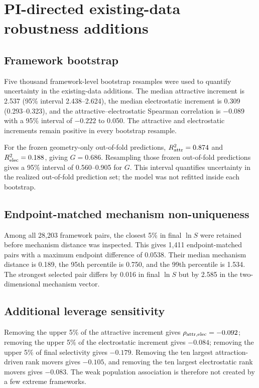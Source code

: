 \documentclass[11pt,a4paper]{article}
\begin{document}
\section{PI-directed existing-data robustness additions}

\subsection{Framework bootstrap}

Five thousand framework-level bootstrap resamples were used to quantify uncertainty in the existing-data additions. The median attractive increment is 2.537 (95\% interval 2.438--2.624), the median electrostatic increment is 0.309 (0.293--0.323), and the attractive--electrostatic Spearman correlation is $-0.089$ with a 95\% interval of $-0.222$ to 0.050. The attractive and electrostatic increments remain positive in every bootstrap resample.

For the frozen geometry-only out-of-fold predictions, $R^2_{\rm attr}=0.874$ and $R^2_{\rm elec}=0.188$, giving $G=0.686$. Resampling those frozen out-of-fold predictions gives a 95\% interval of 0.560--0.905 for $G$. This interval quantifies uncertainty in the realized out-of-fold prediction set; the model was not refitted inside each bootstrap.

\subsection{Endpoint-matched mechanism non-uniqueness}

Among all 28,203 framework pairs, the closest 5\% in final $\ln S$ were retained before mechanism distance was inspected. This gives 1,411 endpoint-matched pairs with a maximum endpoint difference of 0.0538. Their median mechanism distance is 0.189, the 95th percentile is 0.750, and the 99th percentile is 1.534. The strongest selected pair differs by 0.016 in final $\ln S$ but by 2.585 in the two-dimensional mechanism vector.

\subsection{Additional leverage sensitivity}

Removing the upper 5\% of the attractive increment gives $\rho_{\rm attr,elec}=-0.092$; removing the upper 5\% of the electrostatic increment gives $-0.084$; removing the upper 5\% of final selectivity gives $-0.179$. Removing the ten largest attraction-driven rank movers gives $-0.105$, and removing the ten largest electrostatic rank movers gives $-0.083$. The weak population association is therefore not created by a few extreme frameworks.
\end{document}
